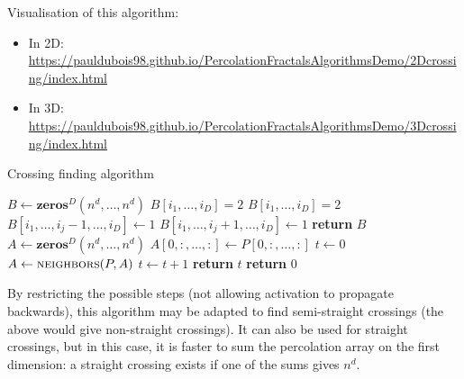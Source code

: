 Visualisation of this algorithm:
\begin{itemize}
	\item In 2D: \url{https://pauldubois98.github.io/PercolationFractalsAlgorithmsDemo/2Dcrossing/index.html}
	\item In 3D: \url{https://pauldubois98.github.io/PercolationFractalsAlgorithmsDemo/3Dcrossing/index.html}
\end{itemize}

\begin{algorithm}[!h]
	\caption{Crossing finding algorithm}\label{algo:crossingFinding}
	\begin{algorithmic}[1]
		\State $B \gets \textbf{zeros$^D$}(n^d,\dots,n^d)$ 
		\State $B[i_1,\dots,i_D] = 2$ 
		\EndIf
		\State $B[i_1,\dots,i_D] = 2$ 
		\State $B[i_1,\dots,i_j-1,\dots,i_D] \gets 1$ 
		\EndIf
		\State $B[i_1,\dots,i_j+1,\dots,i_D] \gets 1$ 
		\EndIf
		\EndFor
		\EndIf
		\EndFor
		\State \textbf{return} $B$
		\EndProcedure
		\State $A \gets \textbf{zeros$^D$}(n^d,\dots,n^d)$ 
		\State $A[0,:,\dots,:] \gets P[0,:,\dots,:]$ 
		\State $t \gets 0$
		\State $A \gets \textsc{neighbors}(P,A)$ 
		\State $t \gets t+1$
		\EndWhile
		\State \textbf{return} $t$
		\Else
		\State \textbf{return} $0$
		\EndIf
		\EndProcedure
	\end{algorithmic}
\end{algorithm}

By restricting the possible steps (not allowing activation to propagate backwards), this algorithm may be adapted to find semi-straight crossings (the above would give non-straight crossings).
It can also be used for straight crossings, but in this case, it is faster to sum the percolation array on the first dimension: a straight crossing exists if one of the sums gives $n^d$.

